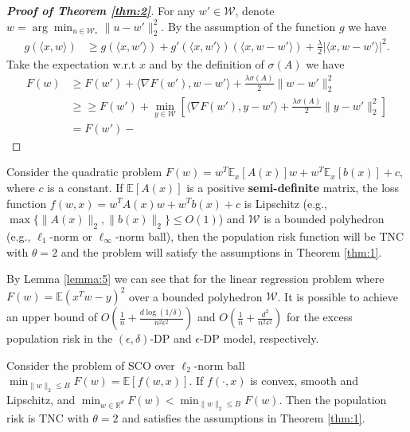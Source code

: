 \documentclass[12pt]{alt2022} %
\begin{document}
\begin{proof}[{\bf Proof of Theorem \ref{thm:2}}]
    For any $w' \in \mathcal{W}$, denote $w=\arg\min_{u\in\mathcal{W_*}}\|u-w'\|_2^2$. By the assumption of the function $g$ we have 
    \begin{align*}
        g(\langle x, w\rangle)& \geq  g(\langle x, w'\rangle)+ g'(\langle x, w'\rangle)(\langle x, w-w' \rangle)+ \frac{\lambda}{2}|\langle x, w-w' \rangle|^2.
    \end{align*}
    Take the expectation w.r.t $x$ and by the definition of $\sigma(A)$ we have 
    \begin{align*}
        F(w)&\geq F(w')+ \langle \nabla F(w'), w-w'\rangle +\frac{\lambda \sigma(A)}{2}\|w-w'\|_2^2 \\
        &\geq \geq F(w')+ \min_{y\in\mathcal{W}}[\langle \nabla F(w'), y-w'\rangle +\frac{\lambda \sigma(A)}{2}\|y-w'\|_2^2] \\
        &= F(w')-
    \end{align*}
\end{proof}
\fi 
\begin{lemma}\label{lemma:5}
    Consider the quadratic problem 
    $F(w)=w^T\mathbb{E}_x[A(x)]w+w^T\mathbb{E}_x[b(x)]+c,$
    where $c$ is a constant. If $\mathbb{E}[A(x)]$ is a positive {\bf semi-definite} matrix, the loss function $f(w, x)=w^TA(x)w+w^Tb(x)+c$ is Lipschitz (e.g., $\max\{\|A(x)\|_2, \|b(x)\|_2\}\leq O(1)$) and $\mathcal{W}$ is a bounded polyhedron (e.g., $\ell_1$-norm or $\ell_\infty$-norm ball), then the population risk function will be TNC with $\theta=2$ and the problem will satisfy the assumptions in Theorem \ref{thm:1}. %
\end{lemma}
By Lemma \ref{lemma:5} we can see that for the linear regression problem where $F(w)=\mathbb{E}(x^Tw-y)^2$ over a bounded polyhedron $\mathcal{W}$. It is possible to achieve an upper bound of $O(\frac{1}{n}+\frac{d\log (1/\delta)}{n^2\epsilon^2})$ and $O(\frac{1}{n}+\frac{d^2}{n^2\epsilon^2})$ for the excess population risk in the $(\epsilon, \delta)$-DP and $\epsilon$-DP model, respectively. 
\begin{lemma}
    Consider the problem of SCO over $\ell_2$-norm ball 
    $ \min_{\|w\|_2\leq B} F(w)=\mathbb{E}[f(w, x)]. 
    $
    If $f(\cdot, x)$ is convex, smooth and Lipschitz, and $\min_{w\in \mathbb{R}^d} F(w)< \min_{\|w\|_2\leq B} F(w)$. Then the population risk is TNC with $\theta=2$ and satisfies the assumptions in Theorem \ref{thm:1}. 
\end{lemma}
\end{document}
